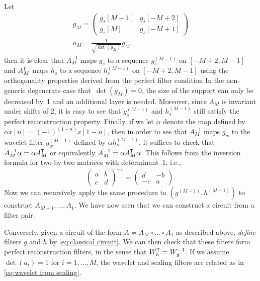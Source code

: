 \documentclass[submission, Phys]{SciPost}
\theoremstyle{definition}
\theoremstyle{remark}
\newcommand*{\tran}{{\mkern-1.5mu\mathsf{T}}}
\begin{document}
\begin{appendix}
Let
\begin{equation*}\begin{aligned}
  g_M = \begin{pmatrix} g_s[M-1] & g_s[-M + 2] \\ g_s[M] & g_s[-M + 1] \end{pmatrix}\\
  a_M = \frac{1}{\sqrt{\det(g_M)}} g_M
\end{aligned}\end{equation*}
then it is clear that $A_M^{-1}$ maps $g_s$ to a sequence $g^{(M-1)}_s$ on $[-M + 2,M-1]$ and $A_M^\tran$ maps $h_s$ to a sequence $h^{(M-1)}_s$ on $[-M + 2,M-1]$ using the orthogonality properties derived from the perfect filter condition
In the non-generic degenerate case that~$\det(g_M) = 0$, the size of the support can only be decreased by~1 and an additional layer is needed.
Moreover, since $A_M$ is invariant under shifts of 2, it is easy to see that $g^{(M-1)}_s$ and $h^{(M-1)}_s$ still satisfy the perfect reconstruction property.
Finally, if we let $\alpha$ denote the map defined by $\alpha x[n] = (-1)^{(1-n)}x[1 - n]$, then in order to see that $A_M^{-1}$ maps $g_w$ to the wavelet filter $g^{(M-1)}_w$ defined by $\alpha h^{(M-1)}_s$, it suffices to check that $ A_M^{-1} \alpha = \alpha A_M^\tran$ or equivalently $ A_M^{-1} = \alpha A_M^\tran \alpha$.
This follows from the inversion formula for two by two matrices with determinant~1, i.e.,
\begin{equation*}
  \begin{pmatrix} a & b \\ c & d \end{pmatrix}^{-1} = \begin{pmatrix} d & -b \\ -c & a \end{pmatrix}.
\end{equation*}
Now we can recursively apply the same procedure to $(g^{(M-1)}, h^{(M-1)})$ to construct $A_{M-1}, \ldots, A_1$.
We have now seen that we can construct a circuit from a filter pair.

Conversely, given a circuit of the form $A = A_M \circ \ldots \circ A_1$ as described above, \emph{define} filters $g$ and $h$ by \cref{eq:classical circuit}.
We can then check that these filters form perfect reconstruction filters, in the sense that $W_h^\tran = W_g^{-1}$.
If we assume $\det(a_i) = 1$ for $i = 1,\ldots,M$, the wavelet and scaling filters are related as in \cref{eq:wavelet from scaling}.



\end{appendix}
\end{document}
